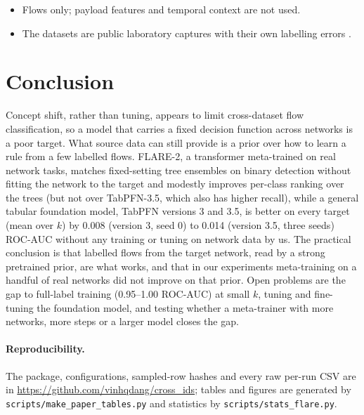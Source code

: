 \documentclass[11pt]{article}
\begin{document}
\begin{itemize}
\item Flows only; payload features and temporal context are not used.
\item The datasets are public laboratory captures with their own labelling errors \citep{engelen2021troubleshooting}.
\end{itemize}

\section{Conclusion}
Concept shift, rather than tuning, appears to limit cross-dataset flow classification, so a model that carries a fixed decision function across networks is a poor target.
What source data can still provide is a prior over how to learn a rule from a few labelled flows.
FLARE-2, a transformer meta-trained on real network tasks, matches fixed-setting tree ensembles on binary detection without fitting the network to the target and modestly improves per-class ranking over the trees (but not over TabPFN-3.5, which also has higher recall), while a general tabular foundation model, TabPFN versions 3 and 3.5, is better on every target (mean over $k$) by 0.008 (version 3, seed 0) to 0.014 (version 3.5, three seeds) ROC-AUC without any training or tuning on network data by us.
The practical conclusion is that labelled flows from the target network, read by a strong pretrained prior, are what works, and that in our experiments meta-training on a handful of real networks did not improve on that prior.
Open problems are the gap to full-label training (0.95--1.00 ROC-AUC) at small $k$, tuning and fine-tuning the foundation model, and testing whether a meta-trainer with more networks, more steps or a larger model closes the gap.

\paragraph{Reproducibility.}
The package, configurations, sampled-row hashes and every raw per-run CSV are in \url{https://github.com/vinhqdang/cross_ids}; tables and figures are generated by \texttt{scripts/make\_paper\_tables.py} and statistics by \texttt{scripts/stats\_flare.py}.



\end{document}
